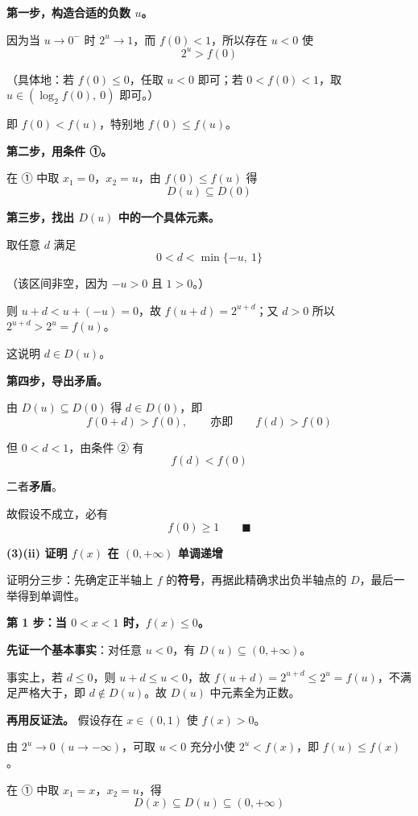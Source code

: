 \textbf{第一步，构造合适的负数 $u$。}

因为当 $u\to0^{-}$ 时 $2^{u}\to1$，而 $f(0)<1$，所以存在 $u<0$ 使
\[2^{u}>f(0)\]

（具体地：若 $f(0)\le0$，任取 $u<0$ 即可；若 $0<f(0)<1$，取 $u\in\left(\log_2 f(0),\ 0\right)$ 即可。）

即 $f(0)<f(u)$，特别地 $f(0)\le f(u)$。

\textbf{第二步，用条件 ①。}

在 ① 中取 $x_1=0$，$x_2=u$，由 $f(0)\le f(u)$ 得
\[D(u)\subseteq D(0)\]

\textbf{第三步，找出 $D(u)$ 中的一个具体元素。}

取任意 $d$ 满足
\[0<d<\min\{-u,\ 1\}\]

（该区间非空，因为 $-u>0$ 且 $1>0$。）

则 $u+d<u+(-u)=0$，故 $f(u+d)=2^{u+d}$；又 $d>0$ 所以 $2^{u+d}>2^{u}=f(u)$。

这说明 $d\in D(u)$。

\textbf{第四步，导出矛盾。}

由 $D(u)\subseteq D(0)$ 得 $d\in D(0)$，即
\[f(0+d)>f(0),\qquad\text{亦即}\qquad f(d)>f(0)\]

但 $0<d<1$，由条件 ② 有
\[f(d)<f(0)\]

二者\textbf{矛盾}。

故假设不成立，必有
\[f(0)\ge1\qquad\blacksquare\]

\par\medskip

\textbf{(3)(ii) 证明 $f(x)$ 在 $(0,+\infty)$ 单调递增}

证明分三步：先确定正半轴上 $f$ 的\textbf{符号}，再据此精确求出负半轴点的 $D$，最后一举得到单调性。

\par\medskip

\textbf{第 1 步：当 $0<x<1$ 时，$f(x)\le0$。}

\textbf{先证一个基本事实}：对任意 $u<0$，有 $D(u)\subseteq(0,+\infty)$。

事实上，若 $d\le0$，则 $u+d\le u<0$，故 $f(u+d)=2^{u+d}\le2^{u}=f(u)$，不满足严格大于，即 $d\notin D(u)$。故 $D(u)$ 中元素全为正数。

\textbf{再用反证法。} 假设存在 $x\in(0,1)$ 使 $f(x)>0$。

由 $2^{u}\to0\ (u\to-\infty)$，可取 $u<0$ 充分小使 $2^{u}<f(x)$，即 $f(u)\le f(x)$。

在 ① 中取 $x_1=x$，$x_2=u$，得
\[D(x)\subseteq D(u)\subseteq(0,+\infty)\]

